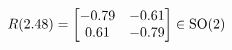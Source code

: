 \documentclass[preview]{standalone}
\begin{document}
\begin{align*}
\special{dvisvgm:raw <g id='unique000'>}R(2.48) = \begin{bmatrix} -0.79 & -0.61 \\ 0.61 & -0.79 \end{bmatrix} \in \text{SO}(2)\special{dvisvgm:raw </g>}
\end{align*}
\end{document}
